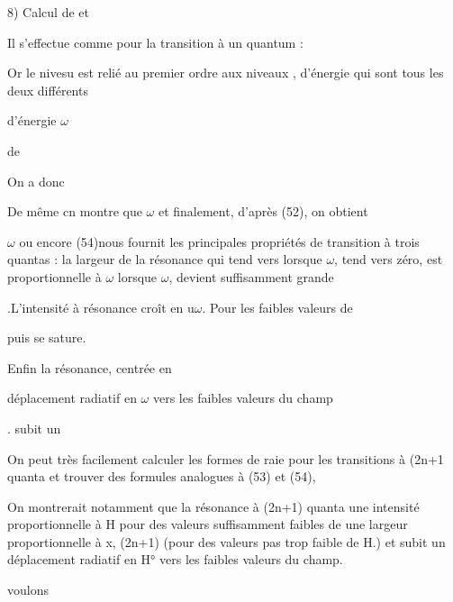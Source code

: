 8) Calcul de  et 

Il s'effectue comme pour la transition à un quantum :


Or le nivesu  est relié au premier ordre aux
niveaux , d'énergie  qui sont tous les deux différents

d'énergie $\omega$

de

On a donc

De même cn montre que
$\omega$
et finalement, d'après (52), on obtient

$\omega$
ou encore
(54)nous fournit les principales propriétés de  transition à trois quantas :
la largeur de la résonance  qui tend vers  lorsque
$\omega$, tend vers zéro, est proportionnelle à $\omega$  lorsque $\omega$, devient suffisamment grande


.L'intensité à résonance croît en u$\omega$. Pour les faibles valeurs de

puis se sature.

Enfin la résonance, centrée en 

déplacement radiatif en $\omega$ vers les faibles valeurs du champ

. subit un

On peut très facilement calculer les formes de raie pour les transitions à (2n+1 quanta
et trouver des formules analogues à (53) et (54),

On montrerait notamment que la résonance à (2n+1) quanta  une intensité
proportionnelle à H pour des valeurs suffisamment faibles de  une
largeur proportionnelle à x, (2n+1) (pour des valeurs pas trop faible de H.)
et subit un déplacement radiatif en H° vers les faibles valeurs du champ.

voulons

